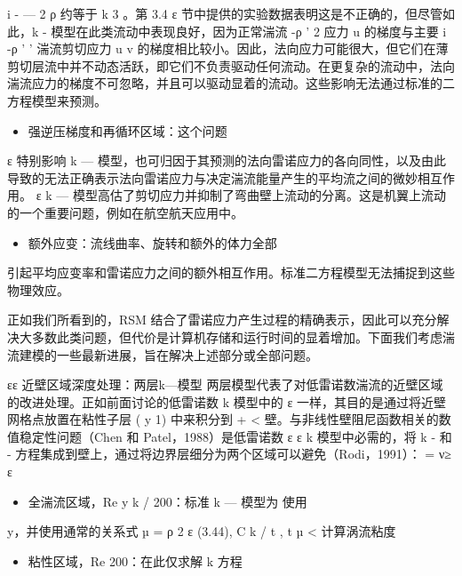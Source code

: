 \documentclass[11pt,a4paper,openany,fontset=none]{ctexbook}
\begin{document}
i - — 2 ρ 约等于 k 3 。第 3.4 ε 节中提供的实验数据表明这是不正确的，但尽管如此，k - 模型在此类流动中表现良好，因为正常湍流 -ρ ' 2 应力 u 的梯度与主要 i -ρ ' ' 湍流剪切应力 u v 的梯度相比较小。因此，法向应力可能很大，但它们在薄剪切层流中并不动态活跃，即它们不负责驱动任何流动。在更复杂的流动中，法向湍流应力的梯度不可忽略，并且可以驱动显着的流动。这些影响无法通过标准的二方程模型来预测。

\begin{itemize}

\item 强逆压梯度和再循环区域：这个问题

\end{itemize}

ε 特别影响 k — 模型，也可归因于其预测的法向雷诺应力的各向同性，以及由此导致的无法正确表示法向雷诺应力与决定湍流能量产生的平均流之间的微妙相互作用。 ε k — 模型高估了剪切应力并抑制了弯曲壁上流动的分离。这是机翼上流动的一个重要问题，例如在航空航天应用中。

\begin{itemize}

\item 额外应变：流线曲率、旋转和额外的体力全部

\end{itemize}

引起平均应变率和雷诺应力之间的额外相互作用。标准二方程模型无法捕捉到这些物理效应。

正如我们所看到的，RSM 结合了雷诺应力产生过程的精确表示，因此可以充分解决大多数此类问题，但代价是计算机存储和运行时间的显着增加。下面我们考虑湍流建模的一些最新进展，旨在解决上述部分或全部问题。

εε 近壁区域深度处理：两层k---模型
两层模型代表了对低雷诺数湍流的近壁区域的改进处理。正如前面讨论的低雷诺数 k 模型中的 ε 一样，其目的是通过将近壁网格点放置在粘性子层 ( y 1) 中来积分到 + < 壁。与非线性壁阻尼函数相关的数值稳定性问题（Chen 和 Patel，1988）是低雷诺数 ε ε k 模型中必需的，将 k - 和 - 方程集成到壁上，通过将边界层细分为两个区域可以避免（Rodi，1991）： = ν≥ ε

\begin{itemize}

\item 全湍流区域，Re y k / 200：标准 k — 模型为
使用

\end{itemize}

y，并使用通常的关系式 µ = ρ 2 ε (3.44), C k / t , t µ < 计算涡流粘度

\begin{itemize}

\item 粘性区域，Re 200：在此仅求解 k 方程

\end{itemize}
\end{document}
